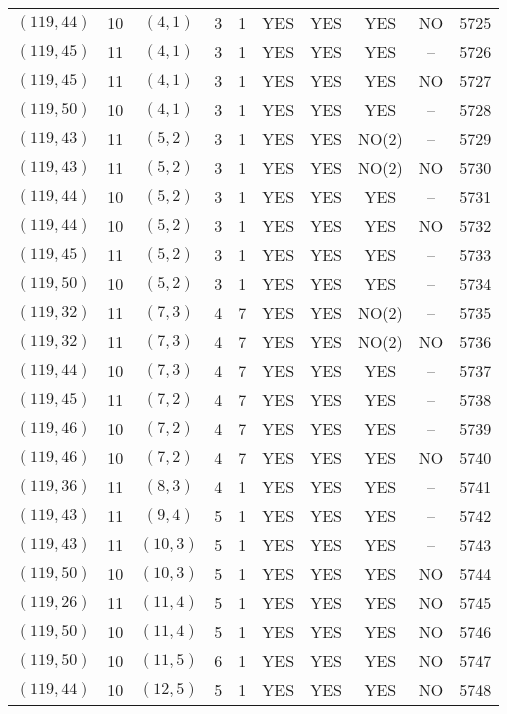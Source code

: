 \begin{longtable}{|c|c|c|c|c|c|c|c|c|c|}
$(119, 44)$ & 10 & $(4, 1)$ & 3 & 1 & YES & YES & YES & NO & 5725\\
$(119, 45)$ & 11 & $(4, 1)$ & 3 & 1 & YES & YES & YES & -- & 5726\\
$(119, 45)$ & 11 & $(4, 1)$ & 3 & 1 & YES & YES & YES & NO & 5727\\
$(119, 50)$ & 10 & $(4, 1)$ & 3 & 1 & YES & YES & YES & -- & 5728\\
$(119, 43)$ & 11 & $(5, 2)$ & 3 & 1 & YES & YES & NO(2) & -- & 5729\\
$(119, 43)$ & 11 & $(5, 2)$ & 3 & 1 & YES & YES & NO(2) & NO & 5730\\
$(119, 44)$ & 10 & $(5, 2)$ & 3 & 1 & YES & YES & YES & -- & 5731\\
$(119, 44)$ & 10 & $(5, 2)$ & 3 & 1 & YES & YES & YES & NO & 5732\\
$(119, 45)$ & 11 & $(5, 2)$ & 3 & 1 & YES & YES & YES & -- & 5733\\
$(119, 50)$ & 10 & $(5, 2)$ & 3 & 1 & YES & YES & YES & -- & 5734\\
$(119, 32)$ & 11 & $(7, 3)$ & 4 & 7 & YES & YES & NO(2) & -- & 5735\\
$(119, 32)$ & 11 & $(7, 3)$ & 4 & 7 & YES & YES & NO(2) & NO & 5736\\
$(119, 44)$ & 10 & $(7, 3)$ & 4 & 7 & YES & YES & YES & -- & 5737\\
$(119, 45)$ & 11 & $(7, 2)$ & 4 & 7 & YES & YES & YES & -- & 5738\\
$(119, 46)$ & 10 & $(7, 2)$ & 4 & 7 & YES & YES & YES & -- & 5739\\
$(119, 46)$ & 10 & $(7, 2)$ & 4 & 7 & YES & YES & YES & NO & 5740\\
$(119, 36)$ & 11 & $(8, 3)$ & 4 & 1 & YES & YES & YES & -- & 5741\\
$(119, 43)$ & 11 & $(9, 4)$ & 5 & 1 & YES & YES & YES & -- & 5742\\
$(119, 43)$ & 11 & $(10, 3)$ & 5 & 1 & YES & YES & YES & -- & 5743\\
$(119, 50)$ & 10 & $(10, 3)$ & 5 & 1 & YES & YES & YES & NO & 5744\\
$(119, 26)$ & 11 & $(11, 4)$ & 5 & 1 & YES & YES & YES & NO & 5745\\
$(119, 50)$ & 10 & $(11, 4)$ & 5 & 1 & YES & YES & YES & NO & 5746\\
$(119, 50)$ & 10 & $(11, 5)$ & 6 & 1 & YES & YES & YES & NO & 5747\\
$(119, 44)$ & 10 & $(12, 5)$ & 5 & 1 & YES & YES & YES & NO & 5748\\

\end{longtable}
